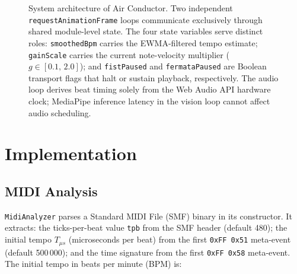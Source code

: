 \documentclass[conference]{IEEEtran}
\begin{document}
\begin{figure}[ht!]
\caption{System architecture of Air Conductor. Two independent
  \texttt{requestAnimationFrame} loops communicate exclusively through
  shared module-level state. The four state variables serve distinct
  roles: \texttt{smoothedBpm} carries the EWMA-filtered tempo estimate;
  \texttt{gainScale} carries the current note-velocity multiplier
  ($g \in [0.1,\,2.0]$); and \texttt{fistPaused} and
  \texttt{fermataPaused} are Boolean transport flags that halt or
  sustain playback, respectively. The audio loop derives beat timing
  solely from the Web Audio API hardware clock; MediaPipe inference
  latency in the vision loop cannot affect audio scheduling.}
\label{fig:architecture}
\end{figure}

\section{Implementation}
\label{sec:impl}

\subsection{MIDI Analysis}

\texttt{MidiAnalyzer} parses a Standard MIDI File (SMF) binary in its
constructor. It extracts: the ticks-per-beat value \texttt{tpb} from
the SMF header (default 480); the initial tempo $T_{\mu s}$
(microseconds per beat) from the first \texttt{0xFF\,0x51} meta-event
(default 500\,000); and the time signature from the first
\texttt{0xFF\,0x58} meta-event. The initial tempo in beats per minute
(BPM) is:
\end{document}
